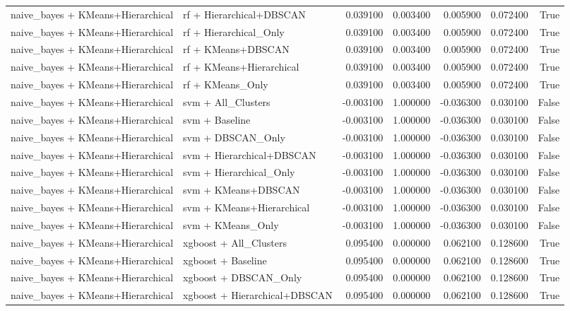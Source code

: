 \begin{tabular}{llrrrrr}
naive_bayes + KMeans+Hierarchical & rf + Hierarchical+DBSCAN & 0.039100 & 0.003400 & 0.005900 & 0.072400 & True \\
naive_bayes + KMeans+Hierarchical & rf + Hierarchical_Only & 0.039100 & 0.003400 & 0.005900 & 0.072400 & True \\
naive_bayes + KMeans+Hierarchical & rf + KMeans+DBSCAN & 0.039100 & 0.003400 & 0.005900 & 0.072400 & True \\
naive_bayes + KMeans+Hierarchical & rf + KMeans+Hierarchical & 0.039100 & 0.003400 & 0.005900 & 0.072400 & True \\
naive_bayes + KMeans+Hierarchical & rf + KMeans_Only & 0.039100 & 0.003400 & 0.005900 & 0.072400 & True \\
naive_bayes + KMeans+Hierarchical & svm + All_Clusters & -0.003100 & 1.000000 & -0.036300 & 0.030100 & False \\
naive_bayes + KMeans+Hierarchical & svm + Baseline & -0.003100 & 1.000000 & -0.036300 & 0.030100 & False \\
naive_bayes + KMeans+Hierarchical & svm + DBSCAN_Only & -0.003100 & 1.000000 & -0.036300 & 0.030100 & False \\
naive_bayes + KMeans+Hierarchical & svm + Hierarchical+DBSCAN & -0.003100 & 1.000000 & -0.036300 & 0.030100 & False \\
naive_bayes + KMeans+Hierarchical & svm + Hierarchical_Only & -0.003100 & 1.000000 & -0.036300 & 0.030100 & False \\
naive_bayes + KMeans+Hierarchical & svm + KMeans+DBSCAN & -0.003100 & 1.000000 & -0.036300 & 0.030100 & False \\
naive_bayes + KMeans+Hierarchical & svm + KMeans+Hierarchical & -0.003100 & 1.000000 & -0.036300 & 0.030100 & False \\
naive_bayes + KMeans+Hierarchical & svm + KMeans_Only & -0.003100 & 1.000000 & -0.036300 & 0.030100 & False \\
naive_bayes + KMeans+Hierarchical & xgboost + All_Clusters & 0.095400 & 0.000000 & 0.062100 & 0.128600 & True \\
naive_bayes + KMeans+Hierarchical & xgboost + Baseline & 0.095400 & 0.000000 & 0.062100 & 0.128600 & True \\
naive_bayes + KMeans+Hierarchical & xgboost + DBSCAN_Only & 0.095400 & 0.000000 & 0.062100 & 0.128600 & True \\
naive_bayes + KMeans+Hierarchical & xgboost + Hierarchical+DBSCAN & 0.095400 & 0.000000 & 0.062100 & 0.128600 & True \\

\end{tabular}
